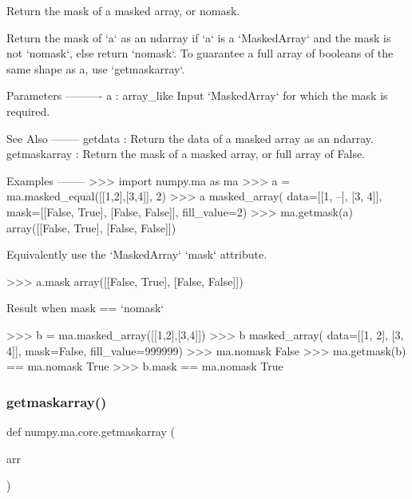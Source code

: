 \begin{DoxyVerb}Return the mask of a masked array, or nomask.

Return the mask of `a` as an ndarray if `a` is a `MaskedArray` and the
mask is not `nomask`, else return `nomask`. To guarantee a full array
of booleans of the same shape as a, use `getmaskarray`.

Parameters
----------
a : array_like
    Input `MaskedArray` for which the mask is required.

See Also
--------
getdata : Return the data of a masked array as an ndarray.
getmaskarray : Return the mask of a masked array, or full array of False.

Examples
--------
>>> import numpy.ma as ma
>>> a = ma.masked_equal([[1,2],[3,4]], 2)
>>> a
masked_array(
  data=[[1, --],
        [3, 4]],
  mask=[[False,  True],
        [False, False]],
  fill_value=2)
>>> ma.getmask(a)
array([[False,  True],
       [False, False]])

Equivalently use the `MaskedArray` `mask` attribute.

>>> a.mask
array([[False,  True],
       [False, False]])

Result when mask == `nomask`

>>> b = ma.masked_array([[1,2],[3,4]])
>>> b
masked_array(
  data=[[1, 2],
        [3, 4]],
  mask=False,
  fill_value=999999)
>>> ma.nomask
False
>>> ma.getmask(b) == ma.nomask
True
>>> b.mask == ma.nomask
True\end{DoxyVerb}
 \mbox{\label{namespacenumpy_1_1ma_1_1core_ab880e3722cf3efc5882510f15aa33b0c}} 
\subsubsection{\texorpdfstring{getmaskarray()}{getmaskarray()}}
{\footnotesize\ttfamily def numpy.\+ma.\+core.\+getmaskarray (\begin{DoxyParamCaption}\item[{}]{arr }\end{DoxyParamCaption})}

